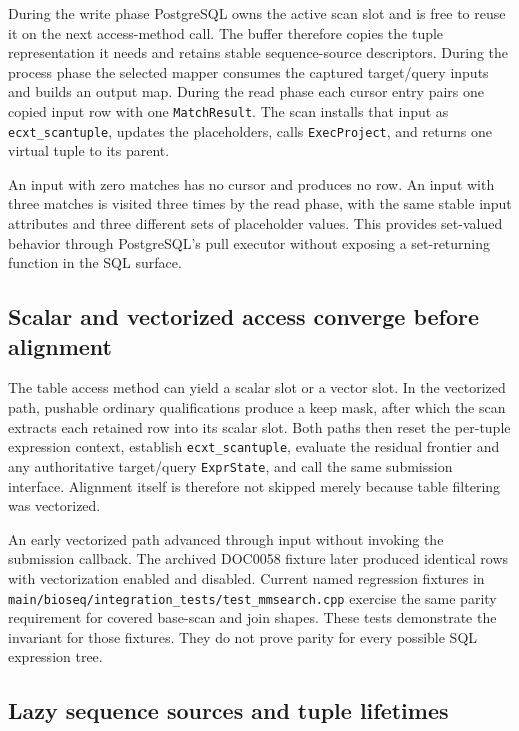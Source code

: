 During the write phase PostgreSQL owns the active scan slot and is free to
reuse it on the next access-method call.  The buffer therefore copies the
tuple representation it needs and retains stable sequence-source
descriptors.  During the process phase the selected mapper consumes the
captured target/query inputs and builds an output map.  During the read phase
each cursor entry pairs one copied input row with one
\texttt{MatchResult}.  The scan installs that input as
\texttt{ecxt\_scantuple}, updates the placeholders, calls
\texttt{ExecProject}, and returns one virtual tuple to its parent.

An input with zero matches has no cursor and produces no row.  An input with
three matches is visited three times by the read phase, with the same stable
input attributes and three different sets of placeholder values.  This
provides set-valued behavior through PostgreSQL's pull executor without
exposing a set-returning function in the SQL surface.

\subsection{Scalar and vectorized access converge before alignment}

The table access method can yield a scalar slot or a vector slot.  In the
vectorized path, pushable ordinary qualifications produce a keep mask, after
which the scan extracts each retained row into its scalar slot.  Both paths
then reset the per-tuple expression context, establish
\texttt{ecxt\_scantuple}, evaluate the residual frontier and any authoritative
target/query \texttt{ExprState}, and call the same submission interface.
Alignment itself is therefore not skipped merely because table filtering was
vectorized.

An early vectorized path advanced through input without invoking the submission
callback.  The archived DOC0058 fixture later produced identical rows with
vectorization enabled and disabled.  Current named regression fixtures in
\texttt{main/bioseq/integration\_tests/test\_mmsearch.cpp} exercise the same
parity requirement for covered base-scan and join shapes.  These tests
demonstrate the invariant for those fixtures.  They do not prove parity for
every possible SQL expression tree.

\subsection{Lazy sequence sources and tuple lifetimes}

